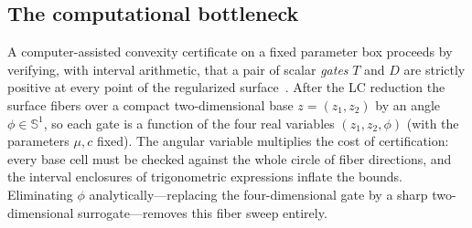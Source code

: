 \documentclass[11pt,reqno]{amsart}
\theoremstyle{plain}
\theoremstyle{definition}
\newcommand{\Sph}{\mathbb{S}}
\begin{document}
\subsection{The computational bottleneck}
A computer-assisted convexity certificate on a fixed parameter box proceeds by verifying, with interval arithmetic, that a pair of scalar \emph{gates} $T$ and $D$ are strictly positive at every point of the regularized surface~\cite{GrisaCertificate}. After the LC reduction the surface fibers over a compact two-dimensional base $z=(z_1,z_2)$ by an angle $\phi\in\Sph^1$, so each gate is a function of the four real variables $(z_1,z_2,\phi)$ (with the parameters $\mu,c$ fixed). The angular variable multiplies the cost of certification: every base cell must be checked against the whole circle of fiber directions, and the interval enclosures of trigonometric expressions inflate the bounds. Eliminating $\phi$ analytically---replacing the four-dimensional gate by a sharp two-dimensional surrogate---removes this fiber sweep entirely.
\end{document}
